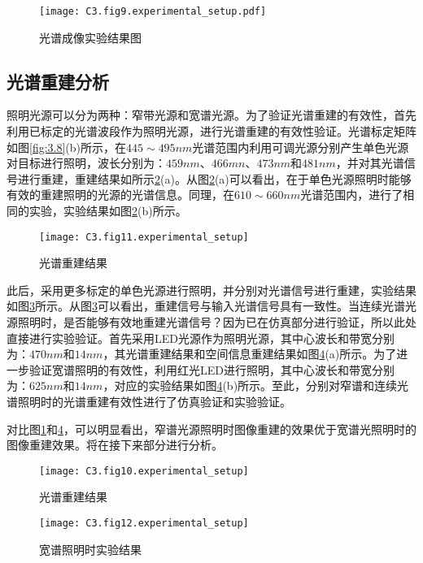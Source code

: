 \begin{figure}[htp]
	\centering
	\texttt{[image: C3.fig9.experimental\_setup.pdf]}
	\caption{光谱成像实验结果图}
	\label{fig:3.9}
\end{figure}

\subsection{光谱重建分析}
照明光源可以分为两种：窄带光源和宽谱光源。为了验证光谱重建的有效性，首先利用已标定的光谱波段作为照明光源，进行光谱重建的有效性验证。光谱标定矩阵如图\ref{fig:3.8}(b)所示，在$445 \sim 495nm$光谱范围内利用可调光源分别产生单色光源对目标进行照明，波长分别为：$459nm$、$466mn$、$473nm$和$481nm$，并对其光谱信号进行重建，重建结果如所示\ref{fig:3.10}(a)。从图\ref{fig:3.10}(a)可以看出，在于单色光源照明时能够有效的重建照明的光源的光谱信息。同理，在$610 \sim 660nm$光谱范围内，进行了相同的实验，实验结果如图\ref{fig:3.10}(b)所示。

\begin{figure}[htp]
	\centering
	\texttt{[image: C3.fig11.experimental\_setup]}
	\caption{光谱重建结果}
	\label{fig:3.10}
\end{figure}

此后，采用更多标定的单色光源进行照明，并分别对光谱信号进行重建，实验结果如图\ref{fig:3.11}所示。从图\ref{fig:3.11}可以看出，重建信号与输入光谱信号具有一致性。当连续光谱光源照明时，是否能够有效地重建光谱信号？因为已在仿真部分进行验证，所以此处直接进行实验验证。首先采用LED光源作为照明光源，其中心波长和带宽分别为：$470nm$和$14nm$，其光谱重建结果和空间信息重建结果如图\ref{fig:3.12}(a)所示。为了进一步验证宽谱照明的有效性，利用红光LED进行照明，其中心波长和带宽分别为：$625nm$和$14nm$，对应的实验结果如图\ref{fig:3.12}(b)所示。至此，分别对窄谱和连续光谱照明时的光谱重建有效性进行了仿真验证和实验验证。

对比图\ref{fig:3.9}和\ref{fig:3.12}，可以明显看出，窄谱光源照明时图像重建的效果优于宽谱光照明时的图像重建效果。将在接下来部分进行分析。

\begin{figure}[htp]
	\centering
	\texttt{[image: C3.fig10.experimental\_setup]}
	\caption{光谱重建结果}
	\label{fig:3.11}
\end{figure}
\begin{figure}[htp]
	\centering
	\texttt{[image: C3.fig12.experimental\_setup]}
	\caption{宽谱照明时实验结果}
	\label{fig:3.12}
\end{figure}


